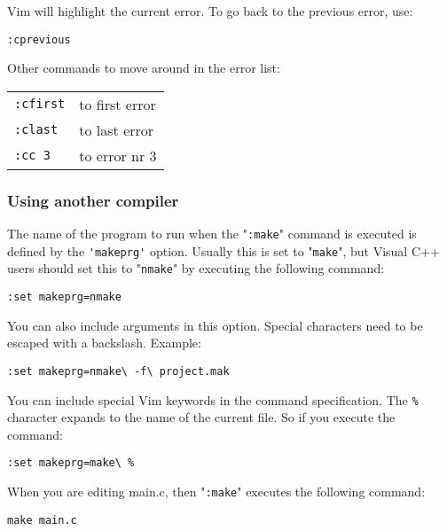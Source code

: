Vim will highlight the current error.
To go back to the previous error, use:

\begin{Verbatim}[samepage=true]
 :cprevious
\end{Verbatim}

Other commands to move around in the error list:

\begin{center} \begin{tabular}{l l}
				\verb!:cfirst! & to first error \\
				\verb!:clast! & to last error \\
				\verb!:cc 3! & to error nr 3 \\
\end{tabular} \end{center}

\subsubsection{Using another compiler}
The name of the program to run when the "\verb!:make!" command is executed is defined by the \verb!'makeprg'! option.
Usually this is set to "\verb!make!", but Visual C++ users should set this to "\verb!nmake!" by executing the following command:

\begin{Verbatim}[samepage=true]
 :set makeprg=nmake
\end{Verbatim}

You can also include arguments in this option.
Special characters need to be escaped with a backslash.
Example:

\begin{Verbatim}[samepage=true]
 :set makeprg=nmake\ -f\ project.mak
\end{Verbatim}

You can include special Vim keywords in the command specification.
The \verb!%! character expands to the name of the current file.
So if you execute the command:

\begin{Verbatim}[samepage=true]
 :set makeprg=make\ %
\end{Verbatim}

When you are editing main.c, then "\verb!:make!" executes the following command:

\begin{Verbatim}[samepage=true]
 make main.c
\end{Verbatim}

